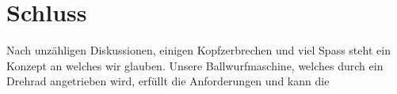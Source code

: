 \section{Schluss}
Nach unzähligen Diskussionen, einigen Kopfzerbrechen und viel Spass steht 
ein Konzept an welches wir glauben. Unsere Ballwurfmaschine, welches durch
ein Drehrad angetrieben wird, erfüllt die Anforderungen und kann die 







